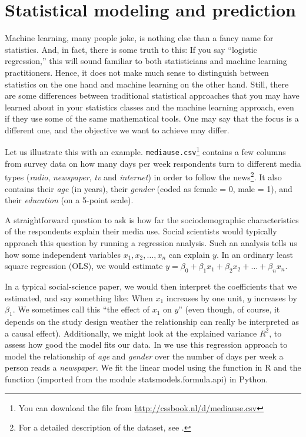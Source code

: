 \section{Statistical modeling and prediction}
\label{sec:prediction}
Machine learning, many people joke, is nothing else than a fancy name
for statistics.  And, in fact, there is some truth to this: If you say
``logistic regression,'' this will sound familiar to both
statisticians and machine learning practitioners.  Hence, it does not
make much sense to distinguish between statistics on the one hand and
machine learning on the other hand.
Still, there are some differences between traditional statistical
approaches that you may have learned about in your statistics classes
and the machine learning approach, even if they use some of the same
mathematical tools. One may say that  the focus is a different
one, and the objective we want to achieve may differ.

Let us illustrate this with an example.
\texttt{mediause.csv}\footnote{You can download the file from
  \url{http://cssbook.nl/d/mediause.csv}} contains a few columns from
survey data on how many days per week respondents turn to different
media types (\emph{radio}, \emph{newspaper}, \emph{tv} and \emph{internet}) in order to follow the news\footnote{For a detailed
  description of the dataset, see \citet{Trilling2013phd}.}. It also
contains their \emph{age} (in years), their \emph{gender} (coded as female = 0, male = 1), and their \emph{education} (on a 5-point scale).

A straightforward question to ask is how far the
sociodemographic characteristics of the respondents explain their
media use.  Social scientists would typically approach this question
by running a regression analysis.  Such an analysis tells us how some
independent variables $x_1, x_2, \ldots, x_n$ can explain $y$.  In an
ordinary least square regression (OLS), we would estimate $y=\beta_0 +
\beta_1 x_1 + \beta_2 x_2 + \ldots + \beta_n x_n$.

In a typical social-science paper, we would then interpret the coefficients
that we estimated, and say something like: When $x_1$ increases by one unit,
$y$ increases by $\beta_1$.
We sometimes call this ``the effect of $x_1$ on $y$'' (even though, of course,
it depends on the study design weather the relationship can really be interpreted
as a causal effect).
Additionally, we might look at the explained variance $R^2$, to assess how good the model fits our data. In  we use this regression approach to model the relationship of \emph{age} and \emph{gender} over the number of days per week a person reads a \emph{newspaper}. We fit the linear model using the  function  in R and the  function  (imported from the module statsmodels.formula.api) in Python.

